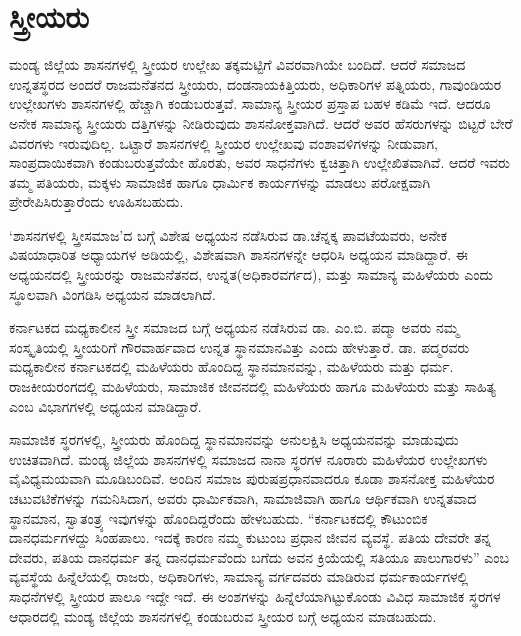 \section*{ಸ್ತ್ರೀಯರು}

ಮಂಡ್ಯ ಜಿಲ್ಲೆಯ ಶಾಸನಗಳಲ್ಲಿ ಸ್ತ್ರೀಯರ ಉಲ್ಲೇಖ ತಕ್ಕಮಟ್ಟಿಗೆ ವಿವರವಾಗಿಯೇ ಬಂದಿದೆ. ಆದರೆ ಸಮಾಜದ ಉನ್ನತಸ್ಥರದ ಅಂದರೆ ರಾಜಮನೆತನದ ಸ್ತ್ರೀಯರು, ದಂಡನಾಯಕಿತ್ತಿಯರು, ಅಧಿಕಾರಿಗಳ ಪತ್ನಿಯರು, ಗಾವುಂಡಿಯರ ಉಲ್ಲೇಖಗಳು ಶಾಸನಗಳಲ್ಲಿ ಹೆಚ್ಚಾಗಿ ಕಂಡುಬರುತ್ತವೆ. ಸಾಮಾನ್ಯ ಸ್ತ್ರೀಯರ ಪ್ರಸ್ತಾಪ ಬಹಳ ಕಡಿಮೆ ಇದೆ. ಆದರೂ ಅನೇಕ ಸಾಮಾನ್ಯ ಸ್ತ್ರೀಯರು ದತ್ತಿಗಳನ್ನು ನೀಡಿರುವುದು ಶಾಸನೋಕ್ತವಾಗಿದೆ. ಆದರೆ ಅವರ ಹೆಸರುಗಳನ್ನು ಬಿಟ್ಟರೆ ಬೇರೆ ವಿವರಗಳು ಇರುವುದಿಲ್ಲ. ಒಟ್ಟಾರೆ ಶಾಸನಗಳಲ್ಲಿ ಸ್ತ್ರೀಯರ ಉಲ್ಲೇಖವು ವಂಶಾವಳಿಗಳನ್ನು ನೀಡುವಾಗ, ಸಾಂಪ್ರದಾಯಿಕವಾಗಿ ಕಂಡುಬರುತ್ತವೆಯೇ ಹೊರತು, ಅವರ ಸಾಧನೆಗಳು ಕ್ವಚಿತ್ತಾಗಿ ಉಲ್ಲೇಖಿತವಾಗಿವೆ. ಆದರೆ ಇವರು ತಮ್ಮ ಪತಿಯರು, ಮಕ್ಕಳು ಸಾಮಾಜಿಕ ಹಾಗೂ ಧಾರ್ಮಿಕ ಕಾರ್ಯಗಳನ್ನು ಮಾಡಲು ಪರೋಕ್ಷವಾಗಿ ಪ್ರೇರೇಪಿಸಿರುತ್ತಾರೆಂದು ಊಹಿಸಬಹುದು.

‘ಶಾಸನಗಳಲ್ಲಿ ಸ್ತ್ರೀಸಮಾಜ’ದ ಬಗ್ಗೆ ವಿಶೇಷ ಅಧ್ಯಯನ ನಡೆಸಿರುವ ಡಾ.ಚೆನ್ನಕ್ಕ ಪಾವಟೆಯವರು, ಅನೇಕ ವಿಷಯಾಧಾರಿತ ಅಧ್ಯಾಯಗಳ ಅಡಿಯಲ್ಲಿ, ವಿಶೇಷವಾಗಿ ಶಾಸನಗಳನ್ನೇ ಆಧರಿಸಿ ಅಧ್ಯಯನ ಮಾಡಿದ್ದಾರೆ. ಈ ಅಧ್ಯಯನದಲ್ಲಿ ಸ್ತ್ರೀಯರನ್ನು ರಾಜಮನೆತನದ, ಉನ್ನತ(ಅಧಿಕಾರವರ್ಗದ), ಮತ್ತು ಸಾಮಾನ್ಯ ಮಹಿಳೆಯರು ಎಂದು ಸ್ಥೂಲವಾಗಿ ವಿಂಗಡಿಸಿ ಅಧ್ಯಯನ ಮಾಡಲಾಗಿದೆ.

ಕರ್ನಾಟಕದ ಮಧ್ಯಕಾಲೀನ ಸ್ತ್ರೀ ಸಮಾಜದ ಬಗ್ಗೆ ಅಧ್ಯಯನ ನಡೆಸಿರುವ ಡಾ. ಎಂ.ಬಿ. ಪದ್ಮಾ ಅವರು ನಮ್ಮ ಸಂಸ್ಕೃತಿಯಲ್ಲಿ ಸ್ತ್ರೀಯರಿಗೆ ಗೌರವಾರ್ಹವಾದ ಉನ್ನತ ಸ್ಥಾನಮಾನವಿತ್ತು ಎಂದು ಹೇಳುತ್ತಾರೆ. ಡಾ. ಪದ್ಮರವರು ಮಧ್ಯಕಾಲೀನ ಕರ್ನಾಟಕದಲ್ಲಿ ಮಹಿಳೆಯರು ಹೊಂದಿದ್ದ ಸ್ಥಾನಮಾನವನ್ನು, ಮಹಿಳೆಯರು ಮತ್ತು ಧರ್ಮ. ರಾಜಕೀಯ\-ರಂಗದಲ್ಲಿ ಮಹಿಳೆಯರು, ಸಾಮಾಜಿಕ ಜೀವನದಲ್ಲಿ ಮಹಿಳೆಯರು ಹಾಗೂ ಮಹಿಳೆಯರು ಮತ್ತು ಸಾಹಿತ್ಯ ಎಂಬ ವಿಭಾಗಗಳಲ್ಲಿ ಅಧ್ಯಯನ ಮಾಡಿದ್ದಾರೆ.

ಸಾಮಾಜಿಕ ಸ್ಥರಗಳಲ್ಲಿ, ಸ್ತ್ರೀಯರು ಹೊಂದಿದ್ದ ಸ್ಥಾನಮಾನವನ್ನು ಅನುಲಕ್ಷಿಸಿ ಅಧ್ಯಯನವನ್ನು ಮಾಡುವುದು ಉಚಿತವಾಗಿದೆ. ಮಂಡ್ಯ ಜಿಲ್ಲೆಯ ಶಾಸನಗಳಲ್ಲಿ ಸಮಾಜದ ನಾನಾ ಸ್ಥರಗಳ ನೂರಾರು ಮಹಿಳೆಯರ ಉಲ್ಲೇಖಗಳು ವೈವಿಧ್ಯಮಯವಾಗಿ ಮೂಡಿಬಂದಿವೆ. ಅಂದಿನ ಸಮಾಜ ಪುರುಷಪ್ರಧಾನವಾದರೂ ಕೂಡಾ ಶಾಸನೋಕ್ತ ಮಹಿಳೆಯರ ಚಟುವಟಿಕೆಗಳನ್ನು ಗಮನಿಸಿದಾಗ, ಅವರು ಧಾರ್ಮಿಕವಾಗಿ, ಸಾಮಾಜಿವಾಗಿ ಹಾಗೂ ಆರ್ಥಿಕವಾಗಿ ಉನ್ನತವಾದ ಸ್ಥಾನಮಾನ, ಸ್ವಾತಂತ್ರ್ಯ ಇವುಗಳನ್ನು ಹೊಂದಿದ್ದರೆಂದು ಹೇಳಬಹುದು. “ಕರ್ನಾಟಕದಲ್ಲಿ ಕೌಟುಂಬಿಕ ದಾನಧರ್ಮಗಳದ್ದು ಸಿಂಹಪಾಲು. ಇದಕ್ಕೆ ಕಾರಣ ನಮ್ಮ ಕುಟುಂಬ ಪ್ರಧಾನ ಜೀವನ ವ್ಯವಸ್ಥೆ. ಪತಿಯ ದೇವರೇ ತನ್ನ ದೇವರು, ಪತಿಯ ದಾನಧರ್ಮ ತನ್ನ ದಾನಧರ್ಮವೆಂದು ಬಗೆದು ಅವನ ಕ್ರಿಯೆಯಲ್ಲಿ ಸತಿಯೂ ಪಾಲುಗಾರಳು” ಎಂಬ ವ್ಯವಸ್ಥೆಯ ಹಿನ್ನೆಲೆಯಲ್ಲಿ ರಾಜರು, ಅಧಿಕಾರಿಗಳು, ಸಾಮಾನ್ಯ ವರ್ಗದವರು ಮಾಡಿರುವ ಧರ್ಮಕಾರ್ಯಗಳಲ್ಲಿ ಸಾಧನೆಗಳಲ್ಲಿ ಸ್ತ್ರೀಯರ ಪಾಲೂ ಇದ್ದೇ ಇದೆ. ಈ ಅಂಶಗಳನ್ನು ಹಿನ್ನೆಲೆಯಾಗಿಟ್ಟುಕೊಂಡು ವಿವಿಧ ಸಾಮಾಜಿಕ ಸ್ಥರಗಳ ಆಧಾರದಲ್ಲಿ ಮಂಡ್ಯ ಜಿಲ್ಲೆಯ ಶಾಸನಗಳಲ್ಲಿ ಕಂಡುಬರುವ ಸ್ತ್ರೀಯರ ಬಗ್ಗೆ ಅಧ್ಯಯನ ಮಾಡಬಹುದು.


